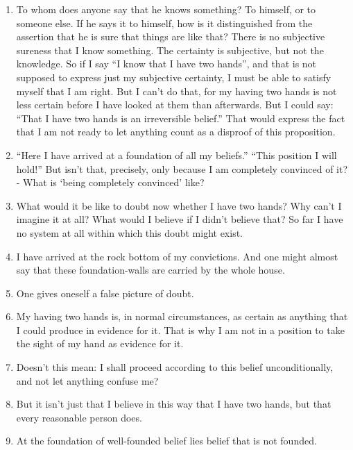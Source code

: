 \documentclass{book}
\begin{document}
\begin{enumerate}
\item
To whom does anyone say that he knows something? To himself, or to someone
else. If he says it to himself, how is it distinguished from the assertion that
he is sure that things are like that? There is no subjective sureness that I
know something. The certainty is subjective, but not the knowledge. So if I say
``I know that I have two hands'', and that is not supposed to express just my
subjective certainty, I must be able to satisfy myself that I am right. But I
can't do that, for my having two hands is not less certain before I have looked
at them than afterwards. But I could say: ``That I have two hands is an
irreversible belief.'' That would express the fact that I am not ready to let
anything count as a disproof of this proposition.

\item
``Here I have arrived at a foundation of all my beliefs.'' ``This position I
will hold!'' But isn't that, precisely, only because I am completely convinced
of it? - What is `being completely convinced' like?

\item
What would it be like to doubt now whether I have two hands? Why can't I
imagine it at all? What would I believe if I didn't believe that? So far I have
no system at all within which this doubt might exist.

\item
I have arrived at the rock bottom of my convictions.  And one might almost say
that these foundation-walls are carried by the whole house.

\item
One gives oneself a false picture of doubt.

\item
My having two hands is, in normal circumstances, as certain as anything that I
could produce in evidence for it.  That is why I am not in a position to take
the sight of my hand as evidence for it.

\item
Doesn't this mean: I shall proceed according to this belief unconditionally,
and not let anything confuse me?

\item
But it isn't just that I believe in this way that I have two hands, but that
every reasonable person does.

\item
At the foundation of well-founded belief lies belief that is not founded.


\end{enumerate}
\end{document}
